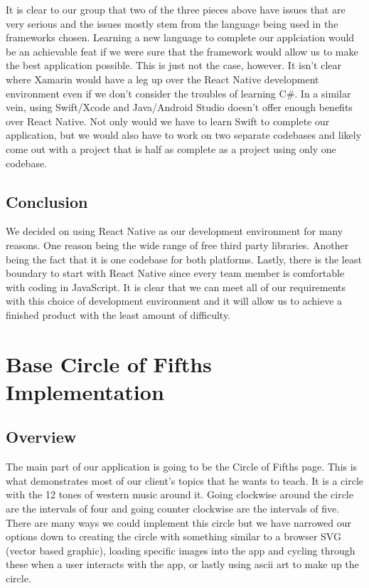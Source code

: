\documentclass[onecolumn, draftclsnofoot,10pt, compsoc]{IEEEtran}
\begin{document}
It is clear to our group that two of the three pieces above have issues that are very serious and the issues mostly stem from the language being used in the frameworks chosen.
Learning a new language to complete our applciation would be an achievable feat if we were sure that the framework would allow us to make the best application possible.
This is just not the case, however.
It isn't clear where Xamarin would have a leg up over the React Native development environment even if we don't consider the troubles of learning C\#.
In a similar vein, using Swift/Xcode and Java/Android Studio doesn't offer enough benefits over React Native.
Not only would we have to learn Swift to complete our application, but we would also have to work on two separate codebases and likely come out with a project that is half as complete as a project using only one codebase.

\subsection{Conclusion}

We decided on using React Native as our development environment for many reasons.
One reason being the wide range of free third party libraries.
Another being the fact that it is one codebase for both platforms.
Lastly, there is the least boundary to start with React Native since every team member is comfortable with coding in JavaScript.
It is clear that we can meet all of our requirements with this choice of development environment and it will allow us to achieve a finished product with the least amount of difficulty.


\section{Base Circle of Fifths Implementation}
\subsection{Overview}

The main part of our application is going to be the Circle of Fifths page.
This is what demonstrates most of our client's topics that he wants to teach.
It is a circle with the 12 tones of western music around it.
Going clockwise around the circle are the intervals of four and going counter clockwise are the intervals of five.
There are many ways we could implement this circle but we have narrowed our options down to creating the circle with something similar to a browser SVG (vector based graphic), loading specific images into the app and cycling through these when a user interacts with the app, or lastly using ascii art to make up the circle.
\end{document}
